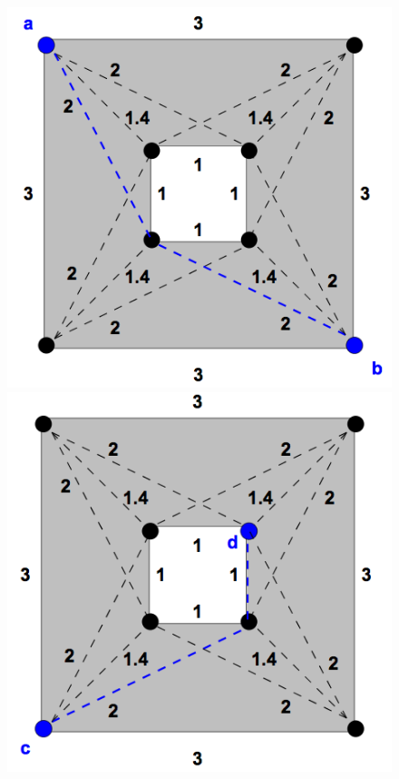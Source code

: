 \documentclass[notheorems,serif,table,compress]{beamer}  %
\begin{document}
\begin{frame}
\begin{figure}
\begin{minipage}[t]{0.29\linewidth}
              \end{minipage}
            \end{figure}
            \begin{figure}
              \centering
              \begin{minipage}[t]{0.3\linewidth}
              \includegraphics[width=1\linewidth]{in7}
              \end{minipage}
              \begin{minipage}[t]{0.3\linewidth}
              \includegraphics[width=1\linewidth]{in8}
              \end{minipage}
            \end{figure}
\end{frame}   
\end{document}
